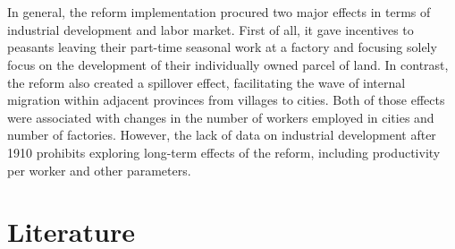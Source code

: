 \documentclass[a4paper, 12pt]{article}
\begin{document}
\\\\
In general, the reform implementation procured two major effects in terms of industrial development and labor market. First of all, it gave incentives to peasants leaving their part-time seasonal work at a factory and focusing solely focus on the development of their individually owned parcel of land. In contrast, the reform also created a spillover effect, facilitating the wave of internal migration within adjacent provinces from villages to cities. Both of those effects were associated with changes in the number of workers employed in cities and number of factories. However, the lack of data on industrial development after 1910 prohibits exploring long-term effects of the reform, including productivity per worker and other parameters. 


    
    
\section{Literature}    
    
    
\end{document}
